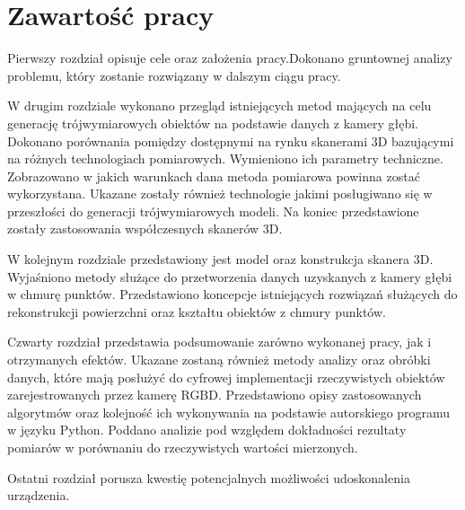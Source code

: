 \section{Zawartość pracy}
Pierwszy rozdział opisuje cele oraz założenia pracy.Dokonano gruntownej analizy problemu, który zostanie rozwiązany w dalszym ciągu pracy.

W drugim rozdziale wykonano przegląd istniejących metod mających na celu generację trójwymiarowych obiektów na podstawie danych z kamery głębi. Dokonano porównania pomiędzy dostępnymi na rynku skanerami 3D bazującymi na różnych technologiach pomiarowych. Wymieniono ich parametry techniczne. Zobrazowano w jakich warunkach dana metoda pomiarowa powinna zostać wykorzystana. Ukazane zostały również technologie jakimi posługiwano się w przeszłości do generacji trójwymiarowych modeli. Na koniec przedstawione zostały zastosowania współczesnych skanerów 3D.

W kolejnym rozdziale przedstawiony jest model oraz konstrukcja skanera 3D. Wyjaśniono metody służące do przetworzenia danych uzyskanych z kamery głębi w chmurę punktów. Przedstawiono koncepcje istniejących rozwiązań służących do rekonstrukcji powierzchni oraz kształtu obiektów z chmury punktów.

Czwarty rozdział przedstawia podsumowanie zarówno wykonanej pracy, jak i otrzymanych efektów. Ukazane zostaną również metody analizy oraz obróbki danych, które mają posłużyć do cyfrowej implementacji rzeczywistych obiektów zarejestrowanych przez kamerę RGBD. Przedstawiono opisy zastosowanych algorytmów oraz kolejność ich wykonywania na podstawie autorskiego programu w języku Python. Poddano analizie pod względem dokładności rezultaty pomiarów w porównaniu do rzeczywistych wartości mierzonych.

Ostatni rozdział porusza kwestię potencjalnych możliwości udoskonalenia urządzenia.